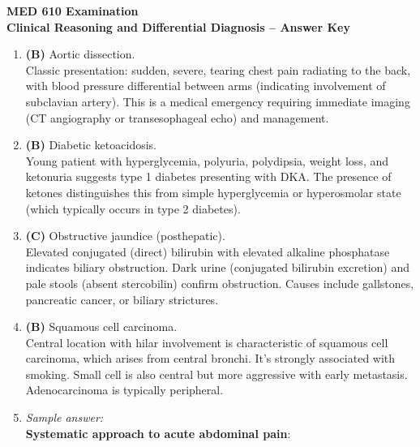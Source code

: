 \documentclass[11pt]{article}
\begin{document}
\begin{center}
  {\Large \textbf{MED 610 Examination}}\\[0.25em]
  {\large \textbf{Clinical Reasoning and Differential Diagnosis -- Answer Key}}\\[0.5em]
\end{center}

\begin{enumerate}[label=\textbf{\arabic*.}]

  \item \textbf{(B)} Aortic dissection.\\
  Classic presentation: sudden, severe, tearing chest pain radiating to the back, with blood pressure 
  differential between arms (indicating involvement of subclavian artery). This is a medical emergency 
  requiring immediate imaging (CT angiography or transesophageal echo) and management.

  \item \textbf{(B)} Diabetic ketoacidosis.\\
  Young patient with hyperglycemia, polyuria, polydipsia, weight loss, and ketonuria suggests 
  type 1 diabetes presenting with DKA. The presence of ketones distinguishes this from simple 
  hyperglycemia or hyperosmolar state (which typically occurs in type 2 diabetes).

  \item \textbf{(C)} Obstructive jaundice (posthepatic).\\
  Elevated conjugated (direct) bilirubin with elevated alkaline phosphatase indicates biliary 
  obstruction. Dark urine (conjugated bilirubin excretion) and pale stools (absent stercobilin) 
  confirm obstruction. Causes include gallstones, pancreatic cancer, or biliary strictures.

  \item \textbf{(B)} Squamous cell carcinoma.\\
  Central location with hilar involvement is characteristic of squamous cell carcinoma, which arises 
  from central bronchi. It's strongly associated with smoking. Small cell is also central but more 
  aggressive with early metastasis. Adenocarcinoma is typically peripheral.

  \item \emph{Sample answer:}\\
  \textbf{Systematic approach to acute abdominal pain}:


\end{enumerate}
\end{document}
